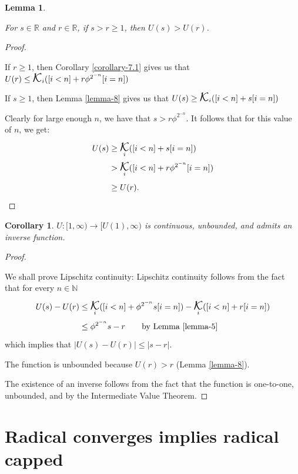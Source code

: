 \documentclass[
]{article}
\DeclareMathOperator*{\kap}{\text{\Large{$\mathcal K$}}}
\theoremstyle{theorem}
\theoremstyle{lemma}
\newtheorem{lemma}{Lemma}
\theoremstyle{corollary}
\newtheorem{corollary}{Corollary}[lemma]
\theoremstyle{remark}
\theoremstyle{definition}
\begin{document}
\begin{lemma}
\hypertarget{lemma-9}{%
\label{lemma-9}}


For \(s \in \mathbb R\) and \(r \in \mathbb R\), if \(s > r \geq 1\), then \(U(s) > U(r)\).

\end{lemma}
\begin{proof}

\hypertarget{proof-11}{%
\label{proof-11}}
If \(r \geq 1\), then Corollary \ref{corollary-7.1} gives us that \(U(r) \leq \kap_i([i < n] + r\phi^{2^{-n}}[i = n])\)

If \(s \geq 1\), then Lemma \ref{lemma-8} gives us that \(U(s) \geq \kap_i([i < n] + s[i = n])\)

Clearly for large enough \(n\), we have that \(s > r\phi^{2^{-n}}\). It follows that for this value of \(n\), we get: \[\begin{aligned}
U(s) &\geq \kap_i([i < n] + s[i = n]) 
\\ &> \kap_i([i < n] + r\phi^{2^{-n}}[i = n]) 
\\ &\geq U(r).
\end{aligned}\]

\end{proof}
\begin{corollary}
\label{corollary-9.1}
\(U:[1,\infty) \to [U(1), \infty)\) is continuous, unbounded, and admits an inverse function.
\end{corollary}
\begin{proof}

\hypertarget{proof-12}{%
\label{proof-12}}
We shall prove Lipschitz continuity: Lipschitz continuity follows from the fact that for every \(n \in \mathbb N\) \[\begin{aligned}
U(s) - U(r) &\leq \kap_i([i < n] + \phi^{2^{-n}}s[i = n]) - \kap_i([i < n] + r[i = n])\\
&\leq \phi^{2^{-n}}s - r \qquad{\text{by Lemma \ref{lemma-5}}}
\end{aligned}\] which implies that \(|U(s) - U(r)| \leq |s - r|\).

The function is unbounded because \(U(r) > r\) (Lemma \ref{lemma-8}).

The existence of an inverse follows from the fact that the function is one-to-one, unbounded, and by the Intermediate Value Theorem.
\end{proof}
\hypertarget{radical-converges-implies-radical-capped}{%
\section{Radical converges implies radical capped}\label{radical-converges-implies-radical-capped}}
\end{document}
